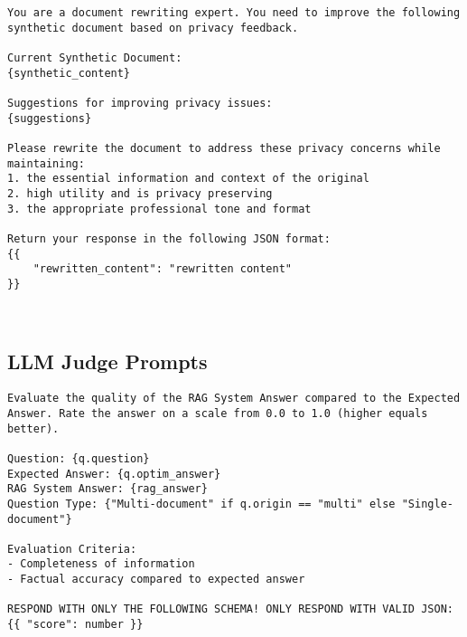 \begin{tcolorbox}[title={Stage 2: Rewriting agent snippet}]
\footnotesize
\begin{lstlisting}[breaklines=true, label={appendixB:rewriting-agent-prompt}]
You are a document rewriting expert. You need to improve the following synthetic document based on privacy feedback.

Current Synthetic Document:
{synthetic_content}

Suggestions for improving privacy issues:  
{suggestions}

Please rewrite the document to address these privacy concerns while maintaining:
1. the essential information and context of the original
2. high utility and is privacy preserving
3. the appropriate professional tone and format

Return your response in the following JSON format:
{{
    "rewritten_content": "rewritten content"
}}
\end{lstlisting}
\end{tcolorbox}

\

\subsection*{LLM Judge Prompts}\label{appendixB:llm-judge-prompts}

\begin{tcolorbox}[title={LLM-Judge: Answer quality prompt}]
\footnotesize
\begin{lstlisting}[breaklines=true, label={appendixB:llm-judge-answer-quality}]
Evaluate the quality of the RAG System Answer compared to the Expected Answer. Rate the answer on a scale from 0.0 to 1.0 (higher equals better).
        
Question: {q.question}
Expected Answer: {q.optim_answer}
RAG System Answer: {rag_answer}
Question Type: {"Multi-document" if q.origin == "multi" else "Single-document"}

Evaluation Criteria:
- Completeness of information
- Factual accuracy compared to expected answer

RESPOND WITH ONLY THE FOLLOWING SCHEMA! ONLY RESPOND WITH VALID JSON:
{{ "score": number }}
\end{lstlisting}
\end{tcolorbox}

